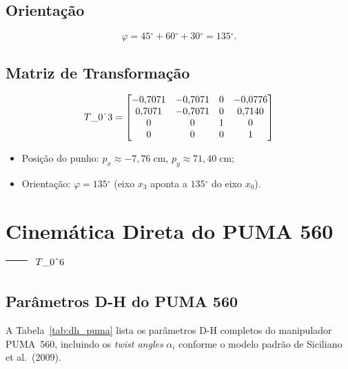 \documentclass[12pt,a4paper]{article}
\def\Trans#1#2{T\string_#1\string^#2}%
\newcommand{\Trans}[2]{{}^{#1}_{#2}\!\mathbf{T}}
\newcommand{\degr}{\ensuremath{^{\circ}}}
\begin{document}
\subsection{Orienta\c{c}\~ao}

\[
  \varphi = 45\degr + 60\degr + 30\degr = 135\degr.
\]

\subsection{Matriz de Transforma\c{c}\~ao}

\begin{tcolorbox}[resultbox, title=Posi\c{c}\~ao e Orienta\c{c}\~ao --- $\Trans{0}{3}$]
\[
  \Trans{0}{3} =
  \begin{bmatrix}
    -0{,}7071 & -0{,}7071 & 0 & -0{,}0776 \\
     0{,}7071 & -0{,}7071 & 0 &  0{,}7140 \\
     0        &  0        & 1 &  0        \\
     0        &  0        & 0 &  1
  \end{bmatrix}
\]
\vspace{4pt}
\begin{itemize}[leftmargin=1.5cm, itemsep=2pt]
  \item Posi\c{c}\~ao do punho: $p_x \approx -7{,}76\;\text{cm}$,\; $p_y \approx 71{,}40\;\text{cm}$;
  \item Orienta\c{c}\~ao: $\varphi = 135\degr$ (eixo $x_3$ aponta a $135\degr$ do eixo $x_0$).
\end{itemize}
\end{tcolorbox}

\newpage
\section{Cinem\'atica Direta do PUMA 560 --- \texorpdfstring{$\Trans{0}{6}$}{T06}}

\subsection{Par\^ametros D-H do PUMA 560}

A Tabela~\ref{tab:dh_puma} lista os par\^ametros D-H completos do manipulador PUMA~560,
incluindo os \textit{twist angles} $\alpha_i$ conforme o modelo padr\~ao de
Siciliano et al.\ (2009).
\end{document}
